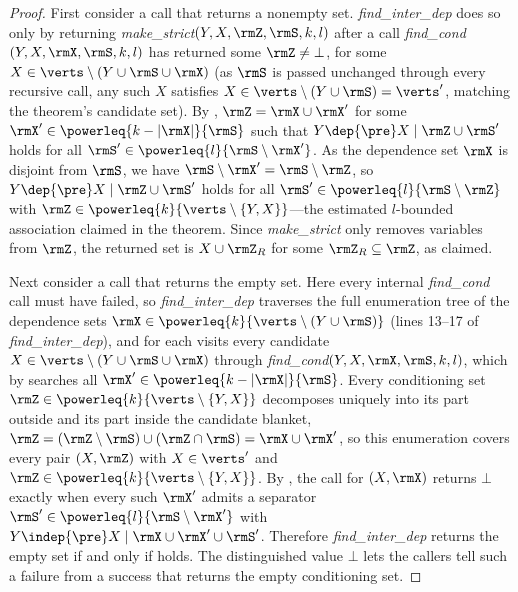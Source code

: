 \assocmine*
\begin{proof}
  First consider a call that returns a nonempty set.
  \textit{find\_inter\_dep} does so only by returning
  \textit{make\_strict}$(Y,X,\rmZ,\rmS,k,l)$ after a call
  \textit{find\_cond}$(Y,X,\rmX,\rmS,k,l)$ has returned some
  $\rmZ\neq\bot$, for some $X\in\verts\setminus(Y\cup\rmS\cup\rmX)$
  (as $\rmS$ is passed unchanged through every recursive call, any such
  $X$ satisfies $X\in\verts\setminus(Y\cup\rmS)=\verts'$, matching the
  theorem's candidate set). By
  , $\rmZ=\rmX\cup\rmX'$ for some
  $\rmX'\in\powerleq{k-|\rmX|}{\rmS}$ such that
  $Y\dep{\pre}X\mid\rmZ\cup\rmS'$ holds for all
  $\rmS'\in\powerleq{l}{\rmS\setminus\rmX'}$. As the dependence set $\rmX$ is
  disjoint from $\rmS$, we have $\rmS\setminus\rmX'=\rmS\setminus\rmZ$, so
  $Y\dep{\pre}X\mid\rmZ\cup\rmS'$ holds for all
  $\rmS'\in\powerleq{l}{\rmS\setminus\rmZ}$ with
  $\rmZ\in\powerleq{k}{\verts\setminus\{Y,X\}}$---the estimated $l$-bounded
  association claimed in the theorem. Since
  \textit{make\_strict} only removes variables from $\rmZ$, the returned
  set is $X\cup\rmZ_{R}$ for some $\rmZ_{R}\subseteq\rmZ$, as claimed.

  Next consider a call that returns the empty set. Here every internal
  \textit{find\_cond} call must have failed, so \textit{find\_inter\_dep}
  traverses the full enumeration tree of the dependence sets
  $\rmX\in\powerleq{k}{\verts\setminus(Y\cup\rmS)}$ (lines 13--17 of
  \textit{find\_inter\_dep}), and for each visits every candidate
  $X\in\verts\setminus(Y\cup\rmS\cup\rmX)$ through
  \textit{find\_cond}$(Y,X,\rmX,\rmS,k,l)$, which by 
  searches all $\rmX'\in\powerleq{k-|\rmX|}{\rmS}$. Every conditioning
  set $\rmZ\in\powerleq{k}{\verts\setminus\{Y,X\}}$ decomposes uniquely
  into its part outside and its part inside the candidate blanket,
  $\rmZ=(\rmZ\setminus\rmS)\cup(\rmZ\cap\rmS)=\rmX\cup\rmX'$, so this
  enumeration covers every pair $(X,\rmZ)$ with $X\in\verts'$ and
  $\rmZ\in\powerleq{k}{\verts\setminus\{Y,X\}}$. By ,
  the call for $(X,\rmX)$ returns $\bot$ exactly when every such $\rmX'$
  admits a separator $\rmS'\in\powerleq{l}{\rmS\setminus\rmX'}$ with
  $Y\indep{\pre}X\mid\rmX\cup\rmX'\cup\rmS'$. Therefore
  \textit{find\_inter\_dep} returns the empty set if and only if
   holds. The distinguished value $\bot$ lets the
  callers tell such a failure from a success that returns the empty
  conditioning set.
\end{proof}

